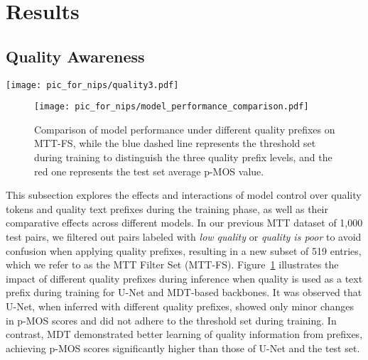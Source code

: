 \section{Results}

\subsection{Quality Awareness}
\begin{figure*}[h]
    \centering
    \texttt{[image: pic\_for\_nips/quality3.pdf]}
    \caption{
\textbf{(Left)} Five VQ-MOS distribution curves are obtained by concurrently using text quality prefixes and quality tokens as controls on the MTT-FS, with quantized MOS levels ranging from 1 to 5 serving as control constraint inferences. The distribution of the training set is normalized by each sample's duration, colored lines represent thresholds of quantized p-MOS tokens during training. \textbf{(Right)} The effect of using quality text prefixes during training is shown, showcasing testing results on four metrics: FAD, KL, IS, and p-MOS, while gray lines for quantized p-MOS.}
    \label{fig:2g}
\end{figure*}
\begin{figure}[ht]
    \centering
    \texttt{[image: pic\_for\_nips/model\_performance\_comparison.pdf]}
    \caption{Comparison of model performance under different quality prefixes on MTT-FS, while the blue dashed line represents the threshold set during training to distinguish the three quality prefix levels, and the red one represents the test set average p-MOS value.}
    \label{fig:pattern_abl}
\end{figure} 
This subsection explores the effects and interactions of model control over quality tokens and quality text prefixes during the training phase, as well as their comparative effects across different models. In our previous MTT dataset of 1,000 test pairs, we filtered out pairs labeled with \textit{low quality} or \textit{quality is poor} to avoid confusion when applying quality prefixes, resulting in a new subset of 519 entries, which we refer to as the MTT Filter Set (MTT-FS).
Figure~\ref{fig:pattern_abl} illustrates the impact of different quality prefixes during inference when quality is used as a text prefix during training for U-Net and MDT-based backbones. It was observed that U-Net, when inferred with different quality prefixes, showed only minor changes in p-MOS scores and did not adhere to the threshold set during training. In contrast, MDT demonstrated better learning of quality information from prefixes, achieving p-MOS scores significantly higher than those of U-Net and the test set.
